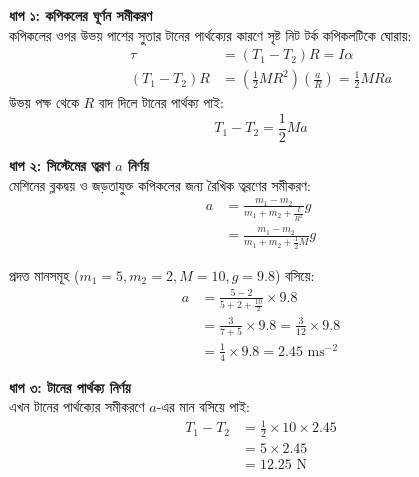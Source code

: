 \documentclass[12pt, a4paper]{article}
\begin{document}
\begin{tcolorbox}[solutionbox={সমাধান (Solution)}]
    \noindent
    \textbf{ধাপ ১: কপিকলের ঘূর্ণন সমীকরণ} \\
    কপিকলের ওপর উভয় পাশের সুতার টানের পার্থক্যের কারণে সৃষ্ট নিট টর্ক কপিকলটিকে ঘোরায়:
    \begin{align*}
        \tau &= (T_1 - T_2) R = I \alpha \\
        (T_1 - T_2) R &= \left(\frac{1}{2} M R^2\right) \left(\frac{a}{R}\right) = \frac{1}{2} M R a
    \end{align*}
    উভয় পক্ষ থেকে $R$ বাদ দিলে টানের পার্থক্য পাই:
    \[ T_1 - T_2 = \frac{1}{2} M a \]
    
    \vspace{0.5em}
    \noindent\textbf{ধাপ ২: সিস্টেমের ত্বরণ $a$ নির্ণয়} \\
    মেশিনের ব্লকদ্বয় ও জড়তাযুক্ত কপিকলের জন্য রৈখিক ত্বরণের সমীকরণ:
    \begin{align*}
        a &= \frac{m_1 - m_2}{m_1 + m_2 + \frac{I}{R^2}} g \\
          &= \frac{m_1 - m_2}{m_1 + m_2 + \frac{1}{2} M} g
    \end{align*}
    
    প্রদত্ত মানসমূহ ($m_1 = 5, m_2 = 2, M = 10, g = 9.8$) বসিয়ে:
    \begin{align*}
        a &= \frac{5 - 2}{5 + 2 + \frac{10}{2}} \times 9.8 \\
          &= \frac{3}{7 + 5} \times 9.8 = \frac{3}{12} \times 9.8 \\
          &= \frac{1}{4} \times 9.8 = 2.45\text{ ms}^{-2}
    \end{align*}
    
    \vspace{0.5em}
    \noindent\textbf{ধাপ ৩: টানের পার্থক্য নির্ণয়} \\
    এখন টানের পার্থক্যের সমীকরণে $a$-এর মান বসিয়ে পাই:
    \begin{align*}
        T_1 - T_2 &= \frac{1}{2} \times 10 \times 2.45 \\
                  &= 5 \times 2.45 \\
                  &= \mathbf{12.25}\text{ N}
    \end{align*}
\end{tcolorbox}

\newpage
\end{document}
